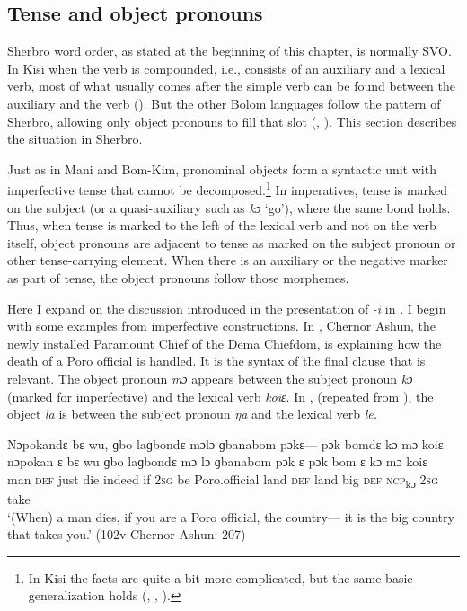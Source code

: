 \subsection{Tense and object pronouns}
\label{sec:8.2.3}\hypertarget{Toc115517817}{}
Sherbro word order, as stated at the beginning of this chapter, is normally SVO. In Kisi when the verb is compounded, i.e., consists of an auxiliary and a lexical verb, most of what usually comes after the simple verb can be found between the auxiliary and the verb (\citealt{Childs1995}). But the other Bolom languages follow the pattern of Sherbro, allowing only object pronouns to fill that slot (\citealt{Childs2011}, \citealt{Childs2020}). This section describes the situation in Sherbro.

Just as in Mani and Bom-Kim, pronominal objects form a syntactic unit with imperfective tense that cannot be decomposed.\footnote{In Kisi the facts are quite a bit more complicated, but the same basic generalization holds (\citealt{Childs1997}, \citealt{Childs2003a}, \citealt{Childs2005}).} In imperatives, tense is marked on the subject (or a quasi-auxiliary such as \textit{kɔ} ‘go'), where the same bond holds. Thus, when tense is marked to the left of the lexical verb and not on the verb itself, object pronouns are adjacent to tense as marked on the subject pronoun or other tense-carrying element. When there is an auxiliary or the negative marker as part of tense, the object pronouns follow those morphemes.

Here I expand on the discussion introduced in the presentation of \textit{{}-i} in . I begin with some examples from imperfective constructions. In , Chernor Ashun, the newly installed Paramount Chief of the Dema Chiefdom, is explaining how the death of a Poro official is handled. It is the syntax of the final clause that is relevant. The object pronoun \textit{mɔ} appears between the subject pronoun \textit{kɔ} (marked for imperfective) and the lexical verb \textit{koiɛ}. In , (repeated from ), the object \textit{la} is between the subject pronoun \textit{ŋa} and the lexical verb \textit{le.}

\ea%
\label{ex:211}

    \ea \label{ex:211a}  Nɔpokandɛ bɛ wu, ɡbo laɡbondɛ mɔlɔ ɡbanabom pɔkɛ— pɔk bomdɛ kɔ mɔ koiɛ.\\
    \gll nɔpokan    ɛ    bɛ    wu  ɡbo    laɡbondɛ  mɔ  lɔ    ɡbanabom pɔk  ɛ    pɔk  bom  ɛ    kɔ      mɔ  koiɛ\\
    man      \textsc{def}  just  die  indeed  if        \textsc{2sg}  be    Poro.official land  \textsc{def}  land  big  \textsc{def}  \textsc{ncp}\textsubscript{kɔ}    \textsc{2sg}  take\\
    \glt ‘(When) a man dies, if you are a Poro official, the country— it is the big country that takes you.' (102v Chernor Ashun: 207)

